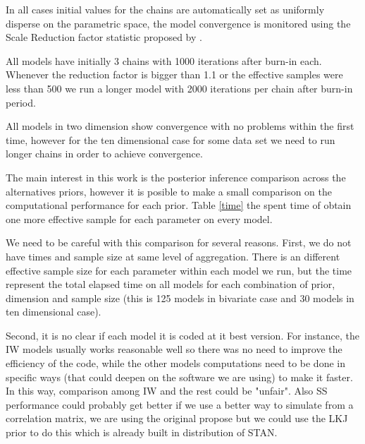 \documentclass{article}
\begin{document}
In all cases initial values for the chains are automatically set as uniformly disperse on the parametric space, the model convergence is monitored using the Scale Reduction factor statistic proposed by \cite{bda2003}. 



All models have initially 3 chains with 1000 iterations after burn-in each. Whenever the reduction factor is bigger than 1.1 or the effective samples were less than 500 we run a longer model with 2000 iterations per chain after burn-in period. 

All models in two dimension show convergence with no problems within the first time, however for the ten dimensional case for some data set we need to run longer chains in order to achieve convergence. 

The main interest in this work is the posterior inference comparison across the alternatives priors, however it is posible to make a small comparison on the computational performance for each prior. Table \ref{time} the spent time of obtain one more effective sample for each parameter on every model. 

We need to be careful with this comparison for several reasons. First, we do not have times and sample size at same level of aggregation.  There is an different effective sample size for each parameter within each model we run, but the time represent the total elapsed time on all models for each combination of prior, dimension and sample size (this is 125 models in bivariate case and 30 models in ten dimensional case).

Second, it is no clear if each model it is coded at it best version.  For instance, the IW models usually works reasonable well so there was no need to improve the efficiency of the code, while the other models computations need to be done in specific ways (that could deepen on the software we are using) to make it faster. In this way, comparison among IW and the rest could be "unfair".  Also SS performance could  probably get better if we use a better way to simulate from a correlation matrix, we are using the \cite{barnard2000} original propose but we could use the LKJ prior to do this which is already built in distribution of STAN. 
\end{document}
